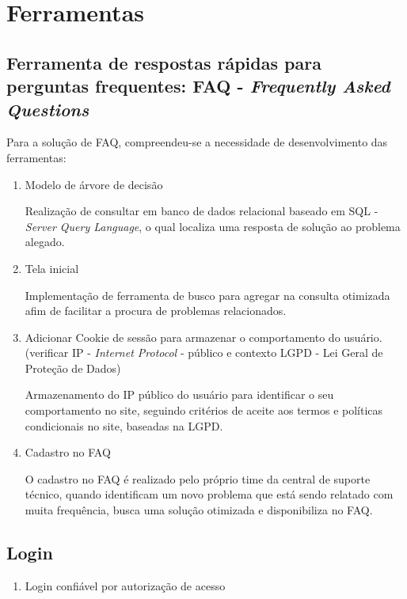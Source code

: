 \documentclass[
    12pt,               %
    openright,          %
    oneside,
    a4paper,            %
    english,            %
    brazil              %
   ]{ifsp-spo-inf-ctds}
\begin{document}
\chapter{Ferramentas}

\section{Ferramenta de respostas rápidas para perguntas frequentes: FAQ - \textit{Frequently Asked Questions}}

	Para a solução de FAQ, compreendeu-se a necessidade de desenvolvimento das ferramentas:
	
	\begin{enumerate}
		
		\item 
		Modelo de árvore de decisão
		
		Realização de consultar em banco de dados relacional baseado em SQL - \textit{Server Query Language}, o qual localiza uma resposta de solução ao problema alegado.
		
		\item 
		Tela inicial
		
		Implementação de ferramenta de busco para agregar na consulta otimizada afim de facilitar a procura de problemas relacionados.
		
		\item 
		Adicionar Cookie de sessão para armazenar o comportamento do usuário. (verificar IP - \textit{Internet Protocol} - público e contexto LGPD - Lei Geral de Proteção de Dados)
		
		Armazenamento do IP público do usuário para identificar o seu comportamento no site, seguindo critérios de aceite aos termos e políticas condicionais no site, baseadas na LGPD.
		
		\item 
		Cadastro no FAQ
		
		O cadastro no FAQ é realizado pelo próprio time da central de suporte técnico, quando identificam um novo problema que está sendo relatado com muita frequência, busca uma solução otimizada e disponibiliza no FAQ. 
		
	\end{enumerate}

\section{Login}

	\begin{enumerate}
		
		\item 
		Login confiável por autorização de acesso
		
	\end{enumerate}
\end{document}
